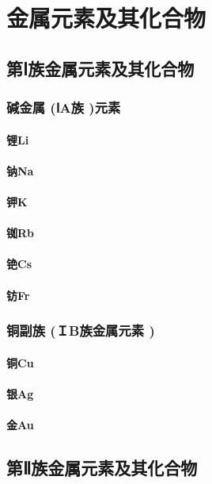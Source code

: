\documentclass[UTF8]{../03-Chemistry}
\begin{document}
\chapter{金属元素及其化合物}
\section{第Ⅰ族金属元素及其化合物}
    \subsection{碱金属 (ⅠA族 )元素}
        \subsubsection{锂Li}
        \subsubsection{钠Na}
        \subsubsection{钾K}
        \subsubsection{铷Rb}
        \subsubsection{铯Cs}
        \subsubsection{钫Fr}
    \subsection{铜副族 (ＩB族金属元素 )}
        \subsubsection{铜Cu}
        \subsubsection{银Ag}
        \subsubsection{金Au}
\section{第Ⅱ族金属元素及其化合物}
\end{document}
